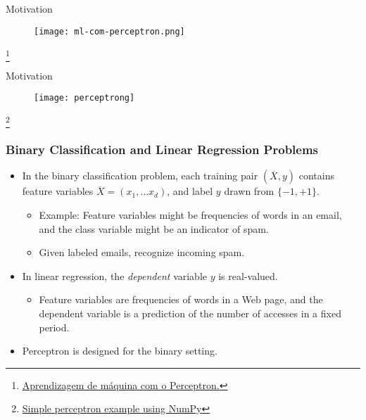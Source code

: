 

\subtitle{Perceptron}



\frame{\titlepage}


\begin{frame}{Motivation}
\begin{figure}[!]
\centering
\texttt{[image: ml-com-perceptron.png]}
\end{figure}
\footnote{\href{https://www.youtube.com/watch?v=-C07ansuc-8}{Aprendizagem de máquina com o Perceptron.}}
\end{frame}


\begin{frame}{Motivation}
\begin{figure}[!]
\centering
\texttt{[image: perceptrong]}
\end{figure}
\footnote{\href{https://github.com/tfvieira/deep-learning/blob/main/src/simple_perceptron/simple_perceptron.py}{Simple perceptron example using NumPy}}
\end{frame}




\begin{frame}
\frametitle{Binary Classification and Linear Regression Problems}
\begin{itemize}
\item In the binary classification problem, each training pair $(\overline{X}, y)$ contains feature variables $\overline{X}=(x_1, \ldots x_d)$, and  label
$y$  drawn from $\{ -1, +1 \}$.
\begin{itemize}
\item Example: Feature variables might be frequencies of words in an
email, and the class variable might be an indicator of spam.
\item Given labeled emails,  recognize incoming spam.
\end{itemize}
\item In linear regression, the {\em dependent} variable $y$ is real-valued.
\begin{itemize}
\item Feature variables are frequencies of words in a Web page,
and the  dependent variable is a prediction of the number of
accesses in a fixed period.
\end{itemize}
\item Perceptron is designed for the binary setting.
\end{itemize}
\end{frame}



